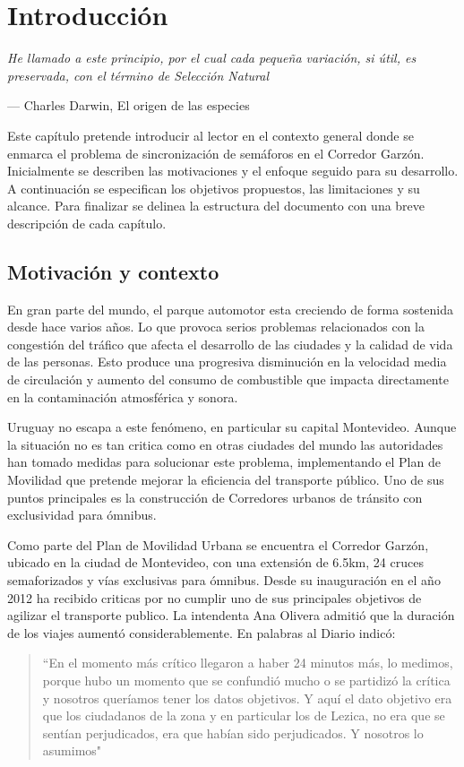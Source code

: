 \chapter{Introducción}
\epigraph{ \textit{He llamado a este principio, por el cual cada pequeña variación, si útil, es preservada, con el término de Selección Natural}}{--- Charles Darwin, El origen de las especies}

Este capítulo pretende introducir al lector en el contexto general donde se enmarca el problema de sincronización de semáforos en el Corredor Garzón. Inicialmente se describen las motivaciones y el enfoque seguido para su desarrollo. A continuación se especifican los objetivos propuestos, las limitaciones y su alcance. Para finalizar se delinea la estructura del documento con una breve descripción de cada capítulo. 

\section{Motivación y contexto}

En gran parte del mundo, el parque automotor esta creciendo de forma sostenida desde hace varios años. Lo que provoca serios problemas relacionados con la congestión del tráfico que afecta el desarrollo de las ciudades y la calidad de vida de las personas. Esto produce una progresiva disminución en la velocidad media de circulación y aumento del consumo de combustible que impacta directamente en la contaminación atmosférica y sonora.

Uruguay no escapa a este fenómeno, en particular su capital Montevideo. Aunque la situación no es tan critica como en otras ciudades del mundo las autoridades han tomado medidas para solucionar este problema, implementando el Plan de Movilidad que pretende mejorar la eficiencia del transporte público. Uno de sus puntos principales es la construcción de Corredores urbanos de tránsito con exclusividad para ómnibus.

Como parte del Plan de Movilidad Urbana se encuentra el Corredor Garzón, ubicado en la ciudad de Montevideo, con una extensión de 6.5km, 24 cruces semaforizados y vías exclusivas para ómnibus. Desde su inauguración en el año 2012 ha recibido criticas por no cumplir uno de sus principales objetivos de agilizar el transporte publico. La intendenta Ana Olivera admitió que la duración de los viajes aumentó considerablemente. En palabras al Diario \cite{olivera2015} indicó: 


\begin{quote}\small
	``En el momento más crítico llegaron a haber 24 minutos más, lo medimos, porque hubo un momento que se confundió mucho o se partidizó la crítica y nosotros queríamos tener los datos objetivos. Y aquí el dato objetivo era que los ciudadanos de la zona y en particular los de Lezica, no era que se sentían perjudicados, era que habían sido perjudicados. Y nosotros lo asumimos"
\end{quote}

